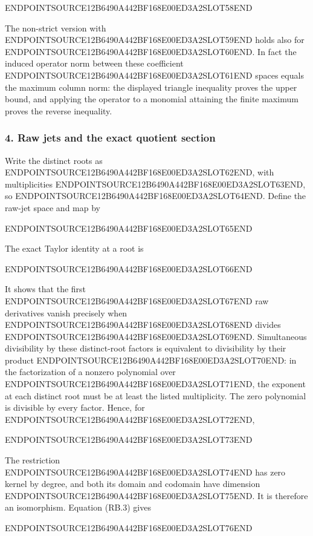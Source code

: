 ENDPOINTSOURCE12B6490A442BF168E00ED3A2SLOT58END

The non-strict version with ENDPOINTSOURCE12B6490A442BF168E00ED3A2SLOT59END holds also for ENDPOINTSOURCE12B6490A442BF168E00ED3A2SLOT60END. In fact the induced operator norm between these coefficient ENDPOINTSOURCE12B6490A442BF168E00ED3A2SLOT61END spaces equals the maximum column norm: the displayed triangle inequality proves the upper bound, and applying the operator to a monomial attaining the finite maximum proves the reverse inequality.

\subsubsection{4. Raw jets and the exact quotient section}\label{endpoint-relation_balance_original--raw-jets-and-the-exact-quotient-section}

Write the distinct roots as ENDPOINTSOURCE12B6490A442BF168E00ED3A2SLOT62END, with multiplicities ENDPOINTSOURCE12B6490A442BF168E00ED3A2SLOT63END, so ENDPOINTSOURCE12B6490A442BF168E00ED3A2SLOT64END. Define the raw-jet space and map by

ENDPOINTSOURCE12B6490A442BF168E00ED3A2SLOT65END

The exact Taylor identity at a root is

ENDPOINTSOURCE12B6490A442BF168E00ED3A2SLOT66END

It shows that the first ENDPOINTSOURCE12B6490A442BF168E00ED3A2SLOT67END raw derivatives vanish precisely when ENDPOINTSOURCE12B6490A442BF168E00ED3A2SLOT68END divides ENDPOINTSOURCE12B6490A442BF168E00ED3A2SLOT69END. Simultaneous divisibility by these distinct-root factors is equivalent to divisibility by their product ENDPOINTSOURCE12B6490A442BF168E00ED3A2SLOT70END: in the factorization of a nonzero polynomial over ENDPOINTSOURCE12B6490A442BF168E00ED3A2SLOT71END, the exponent at each distinct root must be at least the listed multiplicity. The zero polynomial is divisible by every factor. Hence, for ENDPOINTSOURCE12B6490A442BF168E00ED3A2SLOT72END,

ENDPOINTSOURCE12B6490A442BF168E00ED3A2SLOT73END

The restriction ENDPOINTSOURCE12B6490A442BF168E00ED3A2SLOT74END has zero kernel by degree, and both its domain and codomain have dimension ENDPOINTSOURCE12B6490A442BF168E00ED3A2SLOT75END. It is therefore an isomorphism. Equation (RB.3) gives

ENDPOINTSOURCE12B6490A442BF168E00ED3A2SLOT76END

